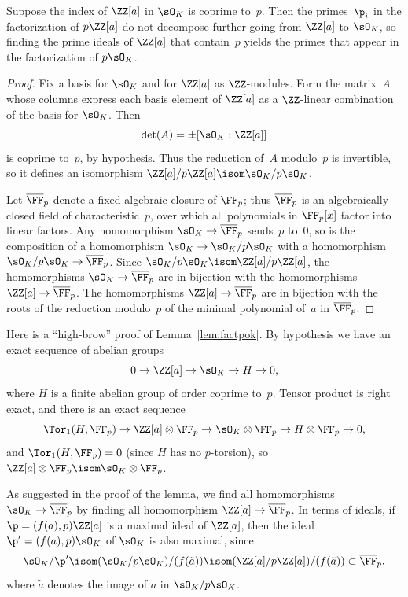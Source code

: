 \begin{lemma}\label{lem:factpok}
  Suppose the index of $\ZZ[a]$ in $\sO_K$ is coprime to~$p$.
  Then the primes~$\p_i$ in the factorization of $p\ZZ[a]$ do not
  decompose further going from $\ZZ[a]$ to $\sO_K$, so finding the
  prime ideals of $\ZZ[a]$ that contain~$p$ yields the primes
  that appear in the factorization of $p\sO_K$.
\end{lemma}
\begin{proof}
  Fix a basis for $\sO_K$ and for $\ZZ[a]$ as $\ZZ$-modules.
  Form the matrix~$A$ whose columns express each basis element
  of $\ZZ[a]$ as a $\ZZ$-linear combination of the basis for $\sO_K$.
  Then
  $$
    \det(A) = \pm [\sO_K:\ZZ[a]]
  $$
  is coprime to~$p$, by hypothesis. Thus the reduction of~$A$
  modulo~$p$ is invertible, so it defines an isomorphism
  $\ZZ[a]/p\ZZ[a] \isom \sO_K/p\sO_K$.

  Let $\overline{\FF}_p$ denote a fixed algebraic closure of $\FF_p$; thus $\overline{\FF}_p$
  is an algebraically closed field of characteristic~$p$, over which
  all polynomials in $\FF_p[x]$ factor into linear factors.
  Any homomorphism $\sO_K\to \overline{\FF}_p$ sends~$p$ to~$0$, so is the composition
  of a homomorphism $\sO_K \to \sO_K/p\sO_K$ with a homomorphism
  $\sO_K/p\sO_K \to \overline{\FF}_p$. Since $\sO_K/p\sO_K \isom \ZZ[a]/p\ZZ[a]$, the
  homomorphisms $\sO_K\to \overline{\FF}_p$ are in bijection with the homomorphisms
  $\ZZ[a]\to \overline{\FF}_p$. The homomorphisms $\ZZ[a]\to\overline{\FF}_p$ are in bijection
  with the roots of the reduction modulo~$p$ of the minimal polynomial
  of~$a$ in $\overline{\FF}_p$.
\end{proof}

\begin{remark}
  Here is a ``high-brow'' proof of Lemma~\ref{lem:factpok}.
  By hypothesis we have an exact sequence of abelian groups
  $$
    0 \to \ZZ[a] \to \sO_K \to H \to 0,
  $$
  where $H$ is a finite abelian group of order coprime to~$p$.
  Tensor product is right exact, and there is an exact sequence
  $$
     \Tor_1(H,\FF_p) \to \ZZ[a]\otimes\FF_p \to \sO_K\otimes\FF_p \to H\otimes\FF_p \to 0,
  $$
  and $\Tor_1(H,\FF_p) = 0$ (since $H$ has no $p$-torsion),
  so $\ZZ[a]\otimes\FF_p \isom \sO_K\otimes\FF_p$.
\end{remark}

As suggested in the proof of the lemma, we find all homomorphisms
$\sO_K\to \overline{\FF}_p$ by finding all homomorphism
$\ZZ[a] \to \overline{\FF}_p$.  In
terms of ideals, if $\p = (f(a),p)\ZZ[a]$ is a maximal ideal of $\ZZ[a]$,
then the ideal $\p' = (f(a),p)\sO_K$ of $\sO_K$ is also maximal, since
$$
  \sO_K/\p'\isom (\sO_K/p\sO_K)/(f(\tilde{a}))
  \isom
  (\ZZ[a]/p\ZZ[a]) / (f(\tilde{a})) \subset \overline{\FF}_p,
$$
where $\tilde{a}$ denotes the image of $a$ in $\sO_K/p\sO_K$.

